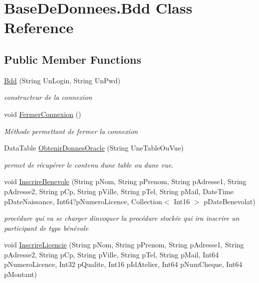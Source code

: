 \hypertarget{class_base_de_donnees_1_1_bdd}{}\section{Base\+De\+Donnees.\+Bdd Class Reference}
\label{class_base_de_donnees_1_1_bdd}
\subsection*{Public Member Functions}
\begin{DoxyCompactItemize}
\item 
\hyperlink{class_base_de_donnees_1_1_bdd_ab7425636f7b6865411160424455ddacf}{Bdd} (String Un\+Login, String Un\+Pwd)
\begin{DoxyCompactList}\small\item\em constructeur de la connexion \end{DoxyCompactList}\item 
void \hyperlink{class_base_de_donnees_1_1_bdd_aa75a70827f654db3f17b9451975446bb}{Fermer\+Connexion} ()
\begin{DoxyCompactList}\small\item\em Méthode permettant de fermer la connexion \end{DoxyCompactList}\item 
Data\+Table \hyperlink{class_base_de_donnees_1_1_bdd_a1f5203fd6378328a9545b47b7dd6bd97}{Obtenir\+Donnes\+Oracle} (String Une\+Table\+Ou\+Vue)
\begin{DoxyCompactList}\small\item\em permet de récupérer le contenu d\textquotesingle{}une table ou d\textquotesingle{}une vue. \end{DoxyCompactList}\item 
void \hyperlink{class_base_de_donnees_1_1_bdd_ac60e11f0e915babf2a78d168bf7a744e}{Inscrire\+Benevole} (String p\+Nom, String p\+Prenom, String p\+Adresse1, String p\+Adresse2, String p\+Cp, String p\+Ville, String p\+Tel, String p\+Mail, Date\+Time p\+Date\+Naissance, Int64?p\+Numero\+Licence, Collection$<$ Int16 $>$ p\+Date\+Benevolat)
\begin{DoxyCompactList}\small\item\em procédure qui va se charger d\textquotesingle{}invoquer la procédure stockée qui ira inscrire un participant de type bénévole \end{DoxyCompactList}\item 
void \hyperlink{class_base_de_donnees_1_1_bdd_a0974d13870c2fdb8484d5f7b2d283f1a}{Inscrire\+Licencie} (String p\+Nom, String p\+Prenom, String p\+Adresse1, String p\+Adresse2, String p\+Cp, String p\+Ville, String p\+Tel, String p\+Mail, Int64 p\+Numero\+Licence, Int32 p\+Qualite, Int16 p\+Id\+Atelier, Int64 p\+Num\+Cheque, Int64 p\+Montant)

\end{DoxyCompactItemize}
